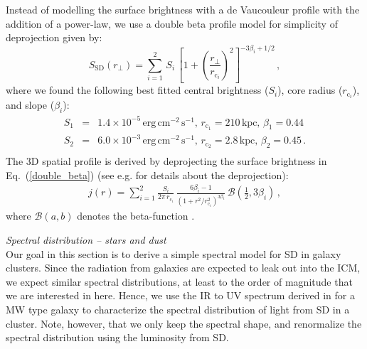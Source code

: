 \documentclass[10pt,aps,pra,reprint,amsmath,amsfonts,amssymb,showpacs]{revtex4-1}
\newcommand{\rmn}{\mathrm}
\newcommand{\sd}{\rmn{SD}}
\begin{document}
Instead of modelling the surface brightness with a de Vaucouleur
profile with the addition of a power-law, we use a double beta profile
model for simplicity of deprojection given by:
\begin{equation}
S_\sd (r_\bot)= \sum_{i=1}^2 \,S_i\, 
\left[1 + \left( \frac{r_\bot}{r_{\mathrm{c}_i}}\right)^2\right]
^{-3\beta_i + 1/2}\,,
\label{double_beta}
\end{equation}
where we found the following best fitted central brightness ($S_i$),
core radius ($r_{\mathrm{c}_i}$), and slope ($\beta_i$):
\begin{eqnarray}
 S_1&=&1.4\times10^{-5}\,\rmn{erg}\,\rmn{cm}^{-2}\,\rmn{s}^{-1},\,
r_{\mathrm{c}_1}=210\,\rmn{kpc},\,
\beta_1=0.44\nonumber\\
 S_2&=&6.0\times10^{-3}\,\rmn{erg}\,\rmn{cm}^{-2}\,\rmn{s}^{-1},\,
r_{\mathrm{c}_2}=2.8\,\rmn{kpc},\,
\beta_2=0.45\,.\nonumber\\
\label{fit_spatial_IR}
\end{eqnarray}
The 3D spatial profile is derived by deprojecting the surface
brightness in Eq.~(\ref{double_beta}) (see
e.g. \cite{2004A&A...413...17P} for details about the deprojection):
\begin{eqnarray}
  j(r)  = \sum_{i=1}^2 \frac{S_i}{2\pi\,r_{\mathrm{c}_i}}\,
  \frac{6 \beta_i - 1}{\left(1 + r^2/r^2_{\mathrm{c}_i}\right)^{3\beta_i}}\,
  \mathcal{B}\left(\frac{1}{2},3\beta_i\right)\,,
\end{eqnarray}
where $\mathcal{B}(a,b)$ denotes the beta-function
\cite{1965hmfw.book.....A}.

{\it Spectral distribution -- stars and dust} \\ Our goal in this
section is to derive a simple spectral model for SD in galaxy
clusters. Since the radiation from galaxies are expected to leak out
into the ICM, we expect similar spectral distributions, at least to
the order of magnitude that we are interested in here. Hence, we use
the IR to UV spectrum derived in \cite{2006ApJ...648L..29P} for a MW
type galaxy to characterize the spectral distribution of light from SD
in a cluster. Note, however, that we only keep the spectral shape, and
renormalize the spectral distribution using the luminosity from SD.
\end{document}
